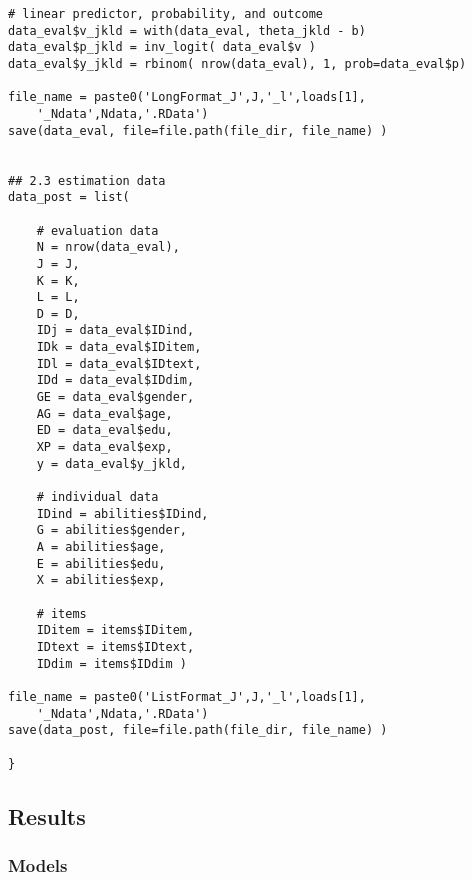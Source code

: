 \begin{lstlisting}
# linear predictor, probability, and outcome
data_eval$v_jkld = with(data_eval, theta_jkld - b)
data_eval$p_jkld = inv_logit( data_eval$v )
data_eval$y_jkld = rbinom( nrow(data_eval), 1, prob=data_eval$p)
		
file_name = paste0('LongFormat_J',J,'_l',loads[1],
	'_Ndata',Ndata,'.RData')
save(data_eval, file=file.path(file_dir, file_name) )
		
	
## 2.3 estimation data
data_post = list(
		
	# evaluation data
	N = nrow(data_eval),
	J = J,
	K = K,
	L = L,
	D = D,
	IDj = data_eval$IDind,
	IDk = data_eval$IDitem,
	IDl = data_eval$IDtext,
	IDd = data_eval$IDdim,
	GE = data_eval$gender,
	AG = data_eval$age,
	ED = data_eval$edu,
	XP = data_eval$exp,
	y = data_eval$y_jkld,
		
	# individual data
	IDind = abilities$IDind,
	G = abilities$gender,
	A = abilities$age,
	E = abilities$edu,
	X = abilities$exp,
		
	# items
	IDitem = items$IDitem,
	IDtext = items$IDtext,
	IDdim = items$IDdim )
		
file_name = paste0('ListFormat_J',J,'_l',loads[1],
	'_Ndata',Ndata,'.RData')
save(data_post, file=file.path(file_dir, file_name) )
		
}
\end{lstlisting}






\subsection{Results} \label{appC2_2:results}

\subsubsection{Models}

